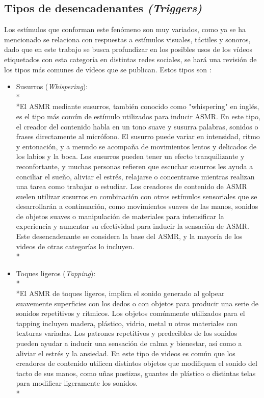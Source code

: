 \documentclass[a4paper,12pt,twoside]{memoir}
\begin{document}
\begin{itemize}
    \subsection{Tipos de desencadenantes \textit{(Triggers)}}
    \text Los estímulos que conforman este fenómeno son muy variados, como ya se ha mencionado se relaciona con respuestas a estímulos visuales, táctiles y sonoros, dado que en este trabajo se busca profundizar en los posibles usos de los vídeos etiquetados con esta categoría en distintas redes sociales, se hará una revisión de los tipos más comunes de vídeos que se publican. Estos tipos son \cite{remfit}: 
    \begin{itemize}
        \item Susurros (\textit{Whispering}): \\*\\*El ASMR mediante susurros, también conocido como "whispering" en inglés, es el tipo más común de estímulo utilizados para inducir ASMR. En este tipo, el creador del contenido habla en un tono suave y susurra palabras, sonidos o frases directamente al micrófono. El susurro puede variar en intensidad, ritmo y entonación, y a menudo se acompaña de movimientos lentos y delicados de los labios y la boca. Los susurros pueden tener un efecto tranquilizante y reconfortante, y muchas personas refieren que escuchar susurros les ayuda a conciliar el sueño, aliviar el estrés, relajarse o concentrarse mientras realizan una tarea como trabajar o estudiar. Los creadores de contenido de ASMR suelen utilizar susurros en combinación con otros estímulos sensoriales que se desarrollarán a continuación, como movimientos suaves de las manos, sonidos de objetos suaves o manipulación de materiales para intensificar la experiencia y aumentar su efectividad para inducir la sensación de ASMR. Este desencadenante se considera la base del ASMR, y la mayoría de los videos de otras categorías lo incluyen.\\*

    \item Toques ligeros (\textit{Tapping}):\\*\\*El ASMR de toques ligeros, implica el sonido generado al golpear suavemente superficies con los dedos o con objetos para producir una serie de sonidos repetitivos y rítmicos. Los objetos comúnmente utilizados para el tapping incluyen madera, plástico, vidrio, metal u otros materiales con texturas variadas.  Los patrones repetitivos y predecibles de los sonidos pueden ayudar a inducir una sensación de calma y bienestar, así como a aliviar el estrés y la ansiedad. En este tipo de videos es común que los creadores de contenido utilicen distintos objetos que modifiquen el sonido del tacto de sus manos, como uñas postizas, guantes de plástico o distintas telas para modificar ligeramente los sonidos.\\*


\end{itemize}
\end{itemize}
\end{document}
